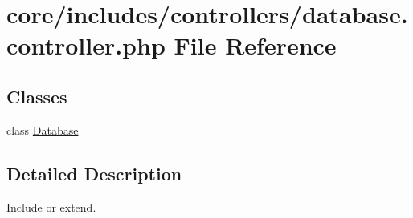 \hypertarget{database_8controller_8php}{}\section{core/includes/controllers/database.controller.\+php File Reference}
\label{database_8controller_8php}
\subsection*{Classes}
\begin{DoxyCompactItemize}
\item 
class \hyperlink{classDatabase}{Database}
\end{DoxyCompactItemize}


\subsection{Detailed Description}
Include or extend. 